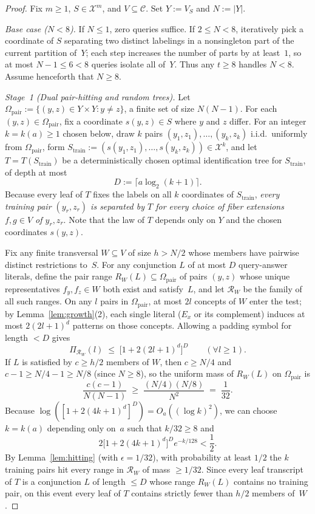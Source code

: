 \documentclass[11pt]{article}
\theoremstyle{plain}
\theoremstyle{definition}
\theoremstyle{remark}
\begin{document}
\begin{proof}
Fix $m \ge 1$, $S \in \mathcal{X}^m$, and $V \subseteq \mathcal{C}$. Set $Y := V_S$ and $N := |Y|$.

\emph{Base case ($N < 8$).} If $N \le 1$, zero queries suffice. If $2 \le N < 8$, iteratively pick a coordinate of $S$ separating two distinct labelings in a nonsingleton part of the current partition of~$Y$; each step increases the number of parts by at least~$1$, so at most $N - 1 \le 6 < 8$ queries isolate all of~$Y$. Thus any $t \ge 8$ handles $N < 8$. Assume henceforth that $N \ge 8$.

\emph{Stage~1 (Dual pair-hitting and random trees).} Let $\Omega_{\mathrm{pair}} := \{(y,z) \in Y \times Y : y \neq z\}$, a finite set of size $N(N-1)$. For each $(y,z) \in \Omega_{\mathrm{pair}}$, fix a coordinate $s(y,z) \in S$ where $y$ and $z$ differ. For an integer $k = k(a) \ge 1$ chosen below, draw $k$ pairs $(y_1,z_1),\dots,(y_k,z_k)$ i.i.d.\ uniformly from $\Omega_{\mathrm{pair}}$, form $S_{\mathrm{train}} := (s(y_1,z_1),\dots,s(y_k,z_k)) \in \mathcal{X}^k$, and let $T = T(S_{\mathrm{train}})$ be a deterministically chosen optimal identification tree for $S_{\mathrm{train}}$, of depth at most
\[
D := \lceil a\log_2(k+1) \rceil.
\]
Because every leaf of $T$ fixes the labels on all $k$ coordinates of $S_{\mathrm{train}}$, \emph{every training pair $(y_r,z_r)$ is separated by $T$ for every choice of fiber extensions $f, g \in V$ of $y_r, z_r$}. Note that the law of $T$ depends only on $Y$ and the chosen coordinates $s(y,z)$.

Fix any finite transversal $W \subseteq V$ of size $h > N/2$ whose members have pairwise distinct restrictions to~$S$. For any conjunction $L$ of at most $D$ query-answer literals, define the pair range $R_W(L) \subseteq \Omega_{\mathrm{pair}}$ of pairs $(y,z)$ whose unique representatives $f_y, f_z \in W$ both exist and satisfy~$L$, and let $\mathcal{R}_W$ be the family of all such ranges. On any $l$ pairs in $\Omega_{\mathrm{pair}}$, at most $2l$ concepts of $W$ enter the test; by Lemma~\ref{lem:growth}(2), each single literal ($E_x$ or its complement) induces at most $2(2l+1)^d$ patterns on those concepts. Allowing a padding symbol for length $< D$ gives
\[
\Pi_{\mathcal{R}_W}(l) \;\le\; \bigl[1 + 2(2l+1)^d\bigr]^D \qquad (\forall l \ge 1).
\]
If $L$ is satisfied by $c \ge h/2$ members of $W$, then $c \ge N/4$ and $c - 1 \ge N/4 - 1 \ge N/8$ (since $N \ge 8$), so the uniform mass of $R_W(L)$ on $\Omega_{\mathrm{pair}}$ is
\[
\frac{c(c-1)}{N(N-1)} \;\ge\; \frac{(N/4)(N/8)}{N^2} \;=\; \frac{1}{32}.
\]
Because $\log([1 + 2(4k+1)^d]^D) = O_a((\log k)^2)$, we can choose $k = k(a)$ depending only on~$a$ such that $k/32 \ge 8$ and
\[
2\bigl[1 + 2(4k+1)^d\bigr]^D e^{-k/128} < \frac{1}{2}.
\]
By Lemma~\ref{lem:hitting} (with $\epsilon = 1/32$), with probability at least $1/2$ the $k$ training pairs hit every range in $\mathcal{R}_W$ of mass $\ge 1/32$. Since every leaf transcript of $T$ is a conjunction $L$ of length $\le D$ whose range $R_W(L)$ contains no training pair, on this event every leaf of $T$ contains strictly fewer than $h/2$ members of~$W$.


\end{proof}
\end{document}
